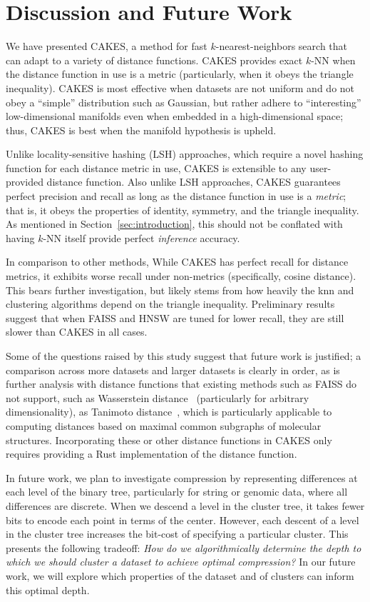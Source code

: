 \section{Discussion and Future Work}
\label{sec:discussion}

We have presented CAKES, a method for fast $k$-nearest-neighbors search that can adapt to a variety of distance functions.
CAKES provides exact $k$-NN when the distance function in use is a metric (particularly, when it obeys the triangle inequality).
CAKES is most effective when datasets are not uniform and do not obey a ``simple'' distribution such as Gaussian, but rather adhere to ``interesting'' low-dimensional manifolds even when embedded in a high-dimensional space; thus, CAKES is best when the manifold hypothesis is upheld.

Unlike locality-sensitive hashing (LSH) approaches, which require a novel hashing function for each distance metric in use, CAKES is extensible to any user-provided distance function.
Also unlike LSH approaches, CAKES guarantees perfect precision and recall as long as the distance function in use is a \emph{metric}; that is, it obeys the properties of identity, symmetry, and the triangle inequality.
As mentioned in Section~\ref{sec:introduction}, this should not be conflated with having $k$-NN itself provide perfect \emph{inference} accuracy.

In comparison to other methods, While CAKES has perfect recall for distance metrics, it exhibits worse recall under non-metrics (specifically, cosine distance). This bears further investigation, but likely stems from how heavily the knn and clustering algorithms depend on the triangle inequality.
Preliminary results suggest that when FAISS and HNSW are tuned for lower recall, they are still slower than CAKES in all cases.

Some of the questions raised by this study suggest that future work is justified; a comparison across more datasets and larger datasets is clearly in order, as is further analysis with distance functions that existing methods such as FAISS do not support, such as Wasserstein distance~\cite{vallender1974calculation} (particularly for arbitrary dimensionality), as Tanimoto distance~\cite{bajusz2015tanimoto}, which is particularly applicable to computing distances based on maximal common subgraphs of molecular structures.
Incorporating these or other distance functions in CAKES only requires providing a Rust implementation of the distance function.

In future work, we plan to investigate compression by representing differences at each level of the
binary tree, particularly for string or genomic data, where all differences are discrete.
When we descend a level in the cluster tree, it takes fewer bits to encode each point in terms of the center. 
However, each descent of a level in the cluster tree increases the bit-cost of specifying a particular cluster. 
This presents the following tradeoff: \emph{How do we algorithmically determine the depth to which we should cluster a dataset to achieve optimal compression?} 
In our future work, we will explore which properties of the dataset and of clusters can inform this optimal depth. 


